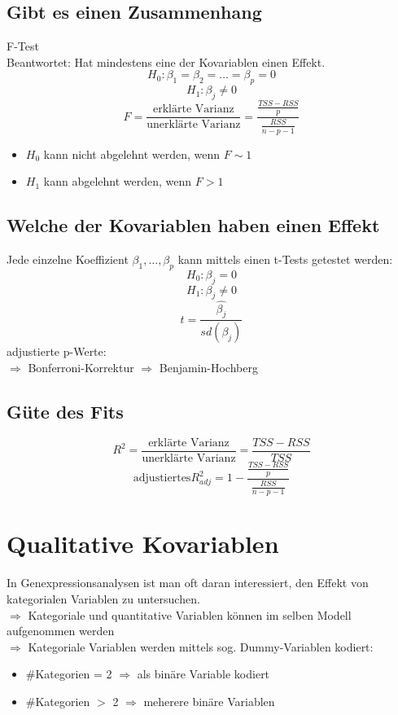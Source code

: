 \subsection{Gibt es einen Zusammenhang} F-Test\\
Beantwortet: Hat mindestens eine der Kovariablen einen Effekt.
\[ H_0: \beta_1=\beta_2=\dots=\beta_p=0 \]
\[ H_1: \beta_j \neq 0 \]
\[F= \frac{\text{erklärte Varianz}}{\text{unerklärte Varianz}} = \frac{\frac{TSS - RSS}{p}}{\frac{RSS}{n-p-1}} \]
\begin{itemize}
	\item $H_0$ kann nicht abgelehnt werden, wenn $F \sim 1$
	\item $H_1$ kann abgelehnt werden, wenn $F > 1$
\end{itemize}

\subsection{Welche der Kovariablen haben einen Effekt}
Jede einzelne Koeffizient $\beta_1,\dots,\beta_p$ kann mittels einen t-Tests getestet werden:
\[ H_0: \beta_j = 0 \]
\[H_1: \beta_j \neq 0 \]
\[ t= \frac{\hat{\beta_j}}{sd(\beta_j)} \]
adjustierte p-Werte: \\
$\Rightarrow$ Bonferroni-Korrektur
$\Rightarrow$ Benjamin-Hochberg

\subsection{Güte des Fits}
\[ R^{2} = \frac{\text{erklärte Varianz}}{\text{unerklärte Varianz}} = \frac{TSS -RSS}{TSS} \]
\[ \text{adjustiertes} R_{adj}^{2} = 1 - \frac{\frac{TSS - RSS}{p}}{\frac{RSS}{n-p-1}} \]

\section{Qualitative Kovariablen}
In Genexpressionsanalysen ist man oft daran interessiert, den Effekt von kategorialen Variablen zu untersuchen.\\
$\Rightarrow$ Kategoriale und quantitative Variablen können im selben Modell aufgenommen werden \\
$\Rightarrow$ Kategoriale Variablen werden mittels sog. Dummy-Variablen kodiert:
	\begin{itemize}
		\item \#Kategorien = 2 $\Rightarrow$ als binäre Variable kodiert
		\item \#Kategorien $>$ 2 $\Rightarrow$ meherere binäre Variablen
	\end{itemize}

